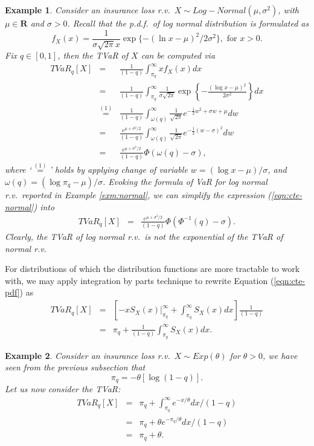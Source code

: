 \documentclass[12pt]{article}
\newtheorem{example}{\bf Example}
\begin{document}
\begin{example}
  Consider an insurance loss r.v.\ $X\sim Log-Normal (\mu,\sigma^2)$, with $\mu\in \mathbf{R}$ and $\sigma>0$.  Recall that the p.d.f.\ of log normal distribution is formulated as
\[
f_X(x)=\frac{1}{\sigma\sqrt{2\pi} x}\exp\{-(\ln x-\mu )^2/2\sigma^2 \}, \text{ for } x>0.
\]
Fix $q\in[0,1]$, then the TVaR of $X$ can be computed via
\begin{eqnarray}
\label{eqn:cte-normal}
  TVaR_q[X] &=& \frac{1}{(1-q)} \int_{\pi_q}^{\infty} x f_X(x)dx \nonumber\\
&=&\frac{1}{(1-q)} \int_{\pi_q}^{\infty} \frac{1}{\sigma \sqrt{2\pi}} \exp\left\{ -\frac{(\log x-\mu)^2}{2\sigma^2}
\right\}dx\nonumber\\
&\overset{(1)}{=}&\frac{1}{(1-q)} \int_{\omega(q)}^{\infty} \frac{1}{\sqrt{2\pi}} e^{ -\frac{1}{2}w^2+\sigma w+\mu}dw\nonumber\\
&=&\frac{e^{\mu+\sigma^2/2}}{(1-q)} \int_{\omega(q)}^{\infty} \frac{1}{\sqrt{2\pi}} e^{ -\frac{1}{2}(w-\sigma)^2}dw\nonumber\\
&=&\frac{e^{\mu+\sigma^2/2}}{(1-q)} \Phi(\omega(q)-\sigma),
\end{eqnarray}
where `$\overset{(1)}{=}$' holds by applying change of variable $w=(\log x-\mu)/\sigma$, and $\omega(q)=(\log \pi_q-\mu)/\sigma$.  Evoking the formula of VaR for log normal r.v.\ reported in Example \ref{exm:normal}, we can simplify the expression (\ref{eqn:cte-normal}) into
\begin{eqnarray*}
  TVaR_q[X] &=& \frac{e^{\mu+\sigma^2/2}}{(1-q)} \Phi(\Phi^{-1}(q)-\sigma).
\end{eqnarray*}
Clearly, the TVaR of log normal r.v.\ is not the exponential of the TVaR of normal r.v.
\end{example}

For distributions of which the distribution functions are more tractable to work with, we may apply integration by parts technique to rewrite Equation (\ref{eqn:cte-pdf}) as
\begin{eqnarray*}
TVaR_{q}[X]&=&\left[-x S_X(x)\big |_{\pi_q}^{\infty}+\int_{\pi_q}^{\infty}S_X(x)dx\right]\frac{1}{(1-q)}\\
&=& \pi_q +\frac{1}{(1-q)}\int_{\pi_q}^{\infty}S_X(x)dx.
\end{eqnarray*}

\begin{example}
\label{exm:cte-exponential}
Consider an insurance loss r.v.\ $X\sim Exp(\theta)$ for $\theta>0$, we have seen from the previous subsection that \[
\pi_q=-\theta[\log(1-q)].
\]
Let us now consider the TVaR:
\begin{eqnarray*}
  TVaR_q[X] &=& \pi_q+\int_{\pi_q}^{\infty} e^{-x/\theta}dx/(1-q)\\
&=& \pi_q+\theta e^{-\pi_q/\theta}dx/(1-q)\\
&=& \pi_q+\theta.
\end{eqnarray*}
\end{example}
\end{document}
